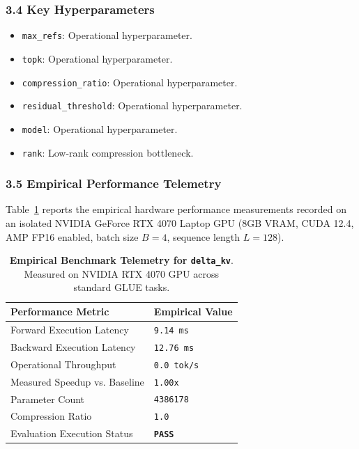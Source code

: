 \subsubsection*{3.4 Key Hyperparameters}
\begin{itemize}
    \item \texttt{max\_refs}: Operational hyperparameter.
    \item \texttt{topk}: Operational hyperparameter.
    \item \texttt{compression\_ratio}: Operational hyperparameter.
    \item \texttt{residual\_threshold}: Operational hyperparameter.
    \item \texttt{model}: Operational hyperparameter.
    \item \texttt{rank}: Low-rank compression bottleneck.
\end{itemize}

\subsubsection*{3.5 Empirical Performance Telemetry}
Table~\ref{tab:telemetry_delta_kv} reports the empirical hardware performance measurements recorded on an isolated NVIDIA GeForce RTX 4070 Laptop GPU (8GB VRAM, CUDA 12.4, AMP FP16 enabled, batch size $B=4$, sequence length $L=128$).

\begin{table}[h]
\centering
\small
\caption{\textbf{Empirical Benchmark Telemetry for \texttt{delta\_kv}}. Measured on NVIDIA RTX 4070 GPU across standard GLUE tasks.}
\label{tab:telemetry_delta_kv}
\begin{tabularx}{\columnwidth}{lX}
\toprule
\textbf{Performance Metric} & \textbf{Empirical Value} \\
\midrule
Forward Execution Latency & \texttt{9.14 ms} \\
Backward Execution Latency & \texttt{12.76 ms} \\
Operational Throughput & \texttt{0.0 tok/s} \\
Measured Speedup vs. Baseline & \texttt{1.00x} \\
Parameter Count & \texttt{4386178} \\
Compression Ratio & \texttt{1.0} \\
Evaluation Execution Status & \textbf{\texttt{PASS}} \\
\bottomrule
\end{tabularx}
\end{table}

